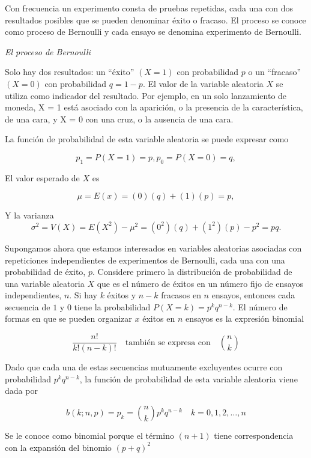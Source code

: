 \documentclass[11pt]{article}
\begin{document}
Con frecuencia un experimento consta de pruebas repetidas, cada una con
dos resultados posibles que se pueden denominar éxito o fracaso. El
proceso se conoce como proceso de Bernoulli y cada ensayo se denomina
experimento de Bernoulli.

\emph{El proceso de Bernoulli}

Solo hay dos resultados: un ``éxito'' \((X = 1)\) con probabilidad \(p\)
o un ``fracaso'' \((X = 0)\) con probabilidad \(q = 1 - p\). El valor de
la variable aleatoria \(X\) se utiliza como indicador del resultado. Por
ejemplo, en un solo lanzamiento de moneda, X = 1 está asociado con la
aparición, o la presencia de la característica, de una cara, y X = 0 con
una cruz, o la ausencia de una cara.

La función de probabilidad de esta variable aleatoria se puede expresar
como

\[
p_{1} = P(X = 1) = p, p_{0} = P(X = 0) = q,
\]

El valor esperado de \(X\) es

\[
\mu = E(x)= (0)(q)+ (1)(p)=p,
\]

Y la varianza
\[                                                        \sigma^2 = V(X) = E(X^2 ) − \mu^2 = (0^2)(q) + (1^2)(p) − p^2 = pq.                                               \]

Supongamos ahora que estamos interesados en variables aleatorias
asociadas con repeticiones independientes de experimentos de Bernoulli,
cada una con una probabilidad de éxito, \(p\). Considere primero la
distribución de probabilidad de una variable aleatoria \(X\) que es el
número de éxitos en un número fijo de ensayos independientes, \(n\). Si
hay \(k\) éxitos y \(n - k\) fracasos en \(n\) ensayos, entonces cada
secuencia de \(1\) y \(0\) tiene la probabilidad
\(P (X = k) = p^k q^{n − k}\). El número de formas en que se pueden
organizar \(x\) éxitos en \(n\) ensayos es la expresión binomial

\[
\frac{n!}{k!(n-k)!} \quad \text{también se expresa con} \quad \binom{n}{k}
\]

Dado que cada una de estas secuencias mutuamente excluyentes ocurre con
probabilidad \(p^k q^{n − k}\), la función de probabilidad de esta
variable aleatoria viene dada por

\[
b(k; n, p) = p_{k}=\binom{n}{k}p^k q^{n − k} \quad k=0,1,2,\ldots,n
\]

Se le conoce como binomial porque el término \((n+1)\) tiene
correspondencia con la expansión del binomio \((p+q)^2\)
\end{document}

